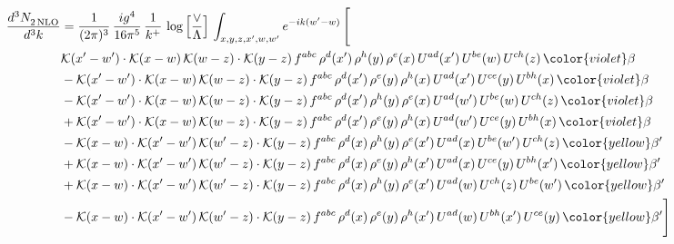 \begin{align}
    \frac{d^{3}N_{2\,\rm NLO}^{\rm}}{d^{3}k}  & = \frac{1}{(2\pi)^{3}}\, \frac{ig^{4}}{16\pi^{5}}\, \frac{1}{k^{+}}\, \log{\left[\frac{\vee}{\Lambda}\right]}\, \int_{x,y,z,x^{\prime},w,w^{\prime}}e^{-ik(w^{\prime}-w)}\, \Bigg[\notag \\ & \mathcal{K}(x'-w')\cdot \mathcal{K}(x-w)\, \mathcal{K}(w-z)\cdot \mathcal{K}(y-z)\,f^{abc}\,\rho^{d}(x')\,\rho^{h}(y)\,\rho^{e}(x)\,U^{ad}(x')\,U^{be}(w)\,U^{ch}(z)\,{\color{violet} \beta}\notag \\ & - \mathcal{K}(x'-w')\cdot \mathcal{K}(x-w)\, \mathcal{K}(w-z)\cdot \mathcal{K}(y-z)\,f^{abc}\,\rho^{d}(x')\,\rho^{e}(y)\,\rho^{h}(x)\,U^{ad}(x')\,U^{ce}(y)\,U^{bh}(x)\,{\color{violet} \beta}\notag \\ & -\mathcal{K}(x'-w')\cdot \mathcal{K}(x-w)\, \mathcal{K}(w-z)\cdot \mathcal{K}(y-z)\,f^{abc}\,\rho^{d}(x')\,\rho^{h}(y)\,\rho^{e}(x)\,U^{ad}(w')\,U^{be}(w)\,U^{ch}(z)\,{\color{violet} \beta}\notag \\ & + \mathcal{K}(x'-w')\cdot \mathcal{K}(x-w)\, \mathcal{K}(w-z)\cdot \mathcal{K}(y-z)\,f^{abc}\,\rho^{d}(x')\,\rho^{e}(y)\,\rho^{h}(x)\,U^{ad}(w')\,U^{ce}(y)\,U^{bh}(x)\,{\color{violet} \beta}\notag \\ & - \mathcal{K}(x-w)\cdot \mathcal{K}(x'-w')\,\mathcal{K}(w'-z)\cdot \mathcal{K}(y-z)\,f^{abc}\,\rho^{d}(x)\,\rho^{h}(y)\,\rho^{e}(x')\,U^{ad}(x)\,U^{be}(w')\,U^{ch}(z)\,{\color{yellow}\beta'}\notag \\ & + \mathcal{K}(x-w)\cdot \mathcal{K}(x'-w')\,\mathcal{K}(w'-z)\cdot \mathcal{K}(y-z)\,f^{abc}\,\rho^{d}(x)\,\rho^{e}(y)\,\rho^{h}(x')\,U^{ad}(x)\,U^{ce}(y)\,U^{bh}(x')\,{\color{yellow}\beta'}\notag \\ & + \mathcal{K}(x-w)\cdot \mathcal{K}(x'-w')\,\mathcal{K}(w'-z)\cdot \mathcal{K}(y-z)\,f^{abc}\,\rho^{d}(x)\,\rho^{h}(y)\,\rho^{e}(x')\,U^{ad}(w)\,U^{ch}(z)\,U^{be}(w')\,{\color{yellow}\beta'}\notag \\ & -\mathcal{K}(x-w)\cdot \mathcal{K}(x'-w')\,\mathcal{K}(w'-z)\cdot \mathcal{K}(y-z)\,f^{abc}\,\rho^{d}(x)\,\rho^{e}(y)\,\rho^{h}(x')\,U^{ad}(w)\,U^{bh}(x')\,U^{ce}(y)\,{\color{yellow}\beta'} \Bigg]
\end{align}
